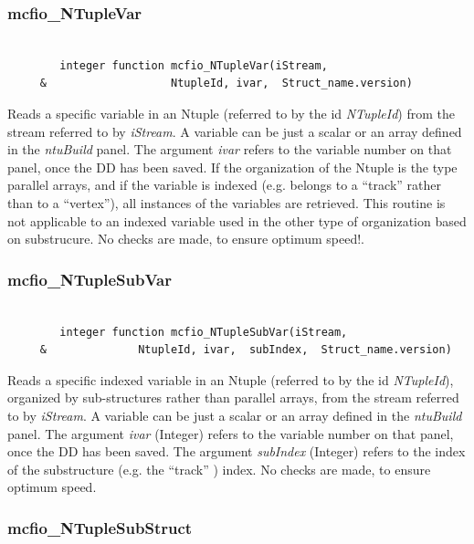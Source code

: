 \subsubsection{mcfio\_NTupleVar}

\begin{verbatim}

        integer function mcfio_NTupleVar(iStream,
     &                   NtupleId, ivar,  Struct_name.version)

\end{verbatim}

Reads a specific variable in an Ntuple (referred to by the id {\em NTupleId})  from
the stream referred to by {\em iStream}.   A variable can be just a scalar or an array
defined in the {\em ntuBuild} panel. The argument {\em ivar} refers to the
variable number on that panel, once the DD has been saved. If the organization
of the Ntuple  is the type parallel arrays, and if the variable is indexed
(e.g. belongs to  a ``track'' rather than to a ``vertex''), all instances of the
variables are  retrieved.  This routine is not applicable to an indexed
variable used in  the other type of organization based on substrucure.
No checks are made, to ensure optimum speed!.

\subsubsection{mcfio\_NTupleSubVar}

\begin{verbatim}

        integer function mcfio_NTupleSubVar(iStream,
     &              NtupleId, ivar,  subIndex,  Struct_name.version)

\end{verbatim}

Reads a specific indexed variable in an Ntuple (referred to by the id {\em
NTupleId}), organized by sub-structures rather than parallel arrays, from the
stream referred to by {\em iStream}.   A variable can be just a scalar or an array
defined in the {\em ntuBuild} panel. The argument {\em ivar} (Integer) refers
to the  variable number on that panel, once the DD has been saved. The
argument  {\em subIndex}  (Integer) refers to the index of the substructure
(e.g. the ``track'' ) index.
No checks are made, to ensure optimum speed.

\subsubsection{mcfio\_NTupleSubStruct}

